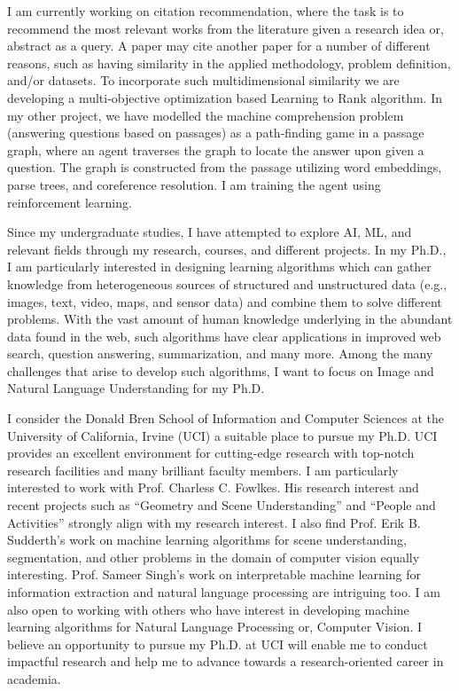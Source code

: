 \documentclass[12pt]{article}
\begin{document}
I am currently working on citation recommendation, where the task is to recommend the most relevant works from the literature given a research idea or, abstract as a query. A paper may cite another paper for a number of different reasons, such as having similarity in the applied methodology, problem definition, and/or datasets. To incorporate such multidimensional similarity we are developing a multi-objective optimization based Learning to Rank algorithm. In my other project, we have modelled the machine comprehension problem (answering questions based on passages) as a path-finding game in a passage graph, where an agent traverses the graph to locate the answer upon given a question. The graph is constructed from the passage utilizing word embeddings, parse trees, and coreference resolution. I am training the agent using reinforcement learning.

Since my undergraduate studies, I have attempted to explore AI, ML, and relevant fields through my research, courses, and different projects. In my Ph.D., I am particularly interested in designing learning algorithms which can gather knowledge from heterogeneous sources of structured and unstructured data (e.g., images, text, video, maps, and sensor data) and combine them to solve different problems. With the vast amount of human knowledge underlying in the abundant data found in the web, such algorithms have clear applications in improved web search, question answering, summarization, and many more. Among the many challenges that arise to develop such algorithms, I want to focus on Image and Natural Language Understanding for my Ph.D.

I consider the Donald Bren School of Information and Computer Sciences at the University of California, Irvine (UCI) a suitable place to pursue my Ph.D. UCI provides an excellent environment for cutting-edge research with top-notch research facilities and many brilliant faculty members. I am particularly interested to work with Prof. Charless C. Fowlkes. His research interest and recent projects such as ``Geometry and Scene Understanding'' and ``People and Activities'' strongly align with my research interest. I also find Prof. Erik B. Sudderth's work on machine learning algorithms for scene understanding, segmentation, and other problems in the domain of computer vision equally interesting. Prof. Sameer Singh’s work on interpretable machine learning for information extraction and natural language processing are intriguing too. I am also open to working with others who have interest in developing machine learning algorithms for Natural Language Processing or, Computer Vision. I believe an opportunity to pursue my Ph.D. at UCI will enable me to conduct impactful research and help me to advance towards a research-oriented career in academia. 
\end{document}
